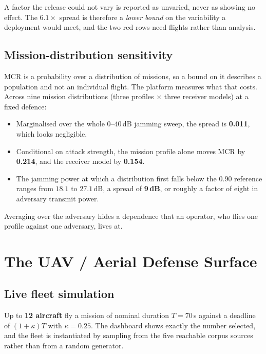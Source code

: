 \documentclass[11pt,a4paper]{article}
\begin{document}
A factor the release could not vary is reported as unvaried, never as showing no
effect. The $6.1\times$ spread is therefore a \emph{lower bound} on the
variability a deployment would meet, and the two red rows need flights rather
than analysis.

\subsection{Mission-distribution sensitivity}
MCR is a probability over a distribution of missions, so a bound on it describes
a population and not an individual flight. The platform measures what that
costs. Across nine mission distributions (three profiles $\times$ three receiver
models) at a fixed defence:

\begin{itemize}
\item Marginalised over the whole $0$--$40$\,dB jamming sweep, the spread is
\textbf{0.011}, which looks negligible.
\item Conditional on attack strength, the mission profile alone moves MCR by
\textbf{0.214}, and the receiver model by \textbf{0.154}.
\item The jamming power at which a distribution first falls below the $0.90$
reference ranges from $18.1$ to $27.1$\,dB, a spread of \textbf{9\,dB}, or
roughly a factor of eight in adversary transmit power.
\end{itemize}

Averaging over the adversary hides a dependence that an operator, who flies one
profile against one adversary, lives at.

\section{The UAV / Aerial Defense Surface}

\subsection{Live fleet simulation}
Up to \textbf{12 aircraft} fly a mission of nominal duration $T = 70$\,s against
a deadline of $(1+\kappa)T$ with $\kappa = 0.25$. The dashboard shows exactly
the number selected, and the fleet is instantiated by sampling from the five
reachable corpus sources rather than from a random generator.
\end{document}
